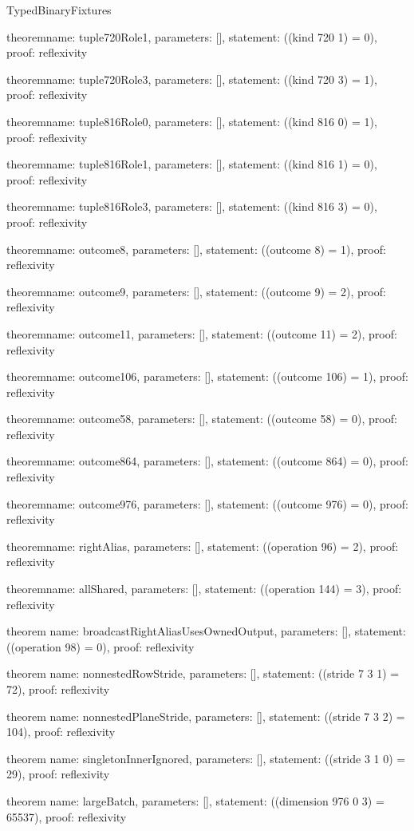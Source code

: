 \begin{lexlean}{TypedBinaryFixtures}
\begin{semanticmodule}
theorem{name: tuple720Role1, parameters: [], statement: ((kind 720 1) = 0), proof: reflexivity{}}

theorem{name: tuple720Role3, parameters: [], statement: ((kind 720 3) = 1), proof: reflexivity{}}

theorem{name: tuple816Role0, parameters: [], statement: ((kind 816 0) = 1), proof: reflexivity{}}

theorem{name: tuple816Role1, parameters: [], statement: ((kind 816 1) = 0), proof: reflexivity{}}

theorem{name: tuple816Role3, parameters: [], statement: ((kind 816 3) = 0), proof: reflexivity{}}

theorem{name: outcome8, parameters: [], statement: ((outcome 8) = 1), proof: reflexivity{}}

theorem{name: outcome9, parameters: [], statement: ((outcome 9) = 2), proof: reflexivity{}}

theorem{name: outcome11, parameters: [], statement: ((outcome 11) = 2), proof: reflexivity{}}

theorem{name: outcome106, parameters: [], statement: ((outcome 106) = 1), proof: reflexivity{}}

theorem{name: outcome58, parameters: [], statement: ((outcome 58) = 0), proof: reflexivity{}}

theorem{name: outcome864, parameters: [], statement: ((outcome 864) = 0), proof: reflexivity{}}

theorem{name: outcome976, parameters: [], statement: ((outcome 976) = 0), proof: reflexivity{}}

theorem{name: rightAlias, parameters: [], statement: ((operation 96) = 2), proof: reflexivity{}}

theorem{name: allShared, parameters: [], statement: ((operation 144) = 3), proof: reflexivity{}}

theorem{
  name: broadcastRightAliasUsesOwnedOutput,
  parameters: [],
  statement: ((operation 98) = 0),
  proof: reflexivity{}
}

theorem{
  name: nonnestedRowStride,
  parameters: [],
  statement: ((stride 7 3 1) = 72),
  proof: reflexivity{}
}

theorem{
  name: nonnestedPlaneStride,
  parameters: [],
  statement: ((stride 7 3 2) = 104),
  proof: reflexivity{}
}

theorem{
  name: singletonInnerIgnored,
  parameters: [],
  statement: ((stride 3 1 0) = 29),
  proof: reflexivity{}
}

theorem{
  name: largeBatch,
  parameters: [],
  statement: ((dimension 976 0 3) = 65537),
  proof: reflexivity{}
}


\end{semanticmodule}
\end{lexlean}
